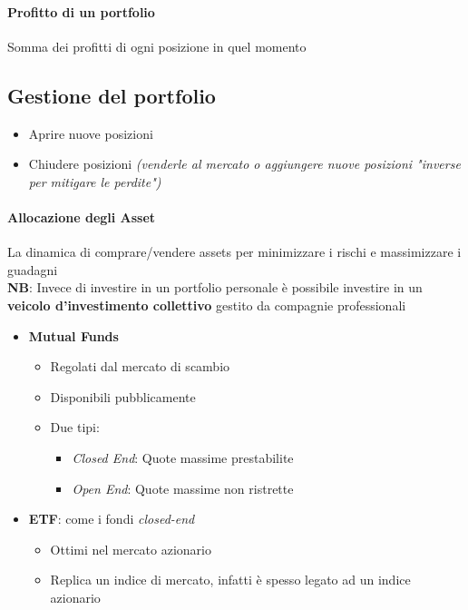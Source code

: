 \documentclass[12pt]{article}
\begin{document}
\paragraph{Profitto di un portfolio} Somma dei profitti di ogni posizione in quel momento
\subsection{Gestione del portfolio}
\begin{itemize}
    \item Aprire nuove posizioni
    \item Chiudere posizioni \textit{(venderle al mercato o aggiungere nuove posizioni "inverse per mitigare le perdite")}
\end{itemize}
\paragraph{Allocazione degli Asset} La dinamica di comprare/vendere assets per minimizzare i rischi e massimizzare i guadagni\\[12pt]
\textbf{NB}: Invece di investire in un portfolio personale è possibile investire in un \textbf{veicolo d'investimento collettivo} gestito da compagnie professionali
\begin{itemize}
    \item \textbf{Mutual Funds}
          \begin{itemize}
              \item Regolati dal mercato di scambio
              \item Disponibili pubblicamente
              \item Due tipi:
                    \begin{itemize}
                        \item \textit{Closed End}: Quote massime prestabilite
                        \item \textit{Open End}: Quote massime non ristrette
                    \end{itemize}
          \end{itemize}
    \item \textbf{ETF}: come i fondi \textit{closed-end}
          \begin{itemize}
              \item Ottimi nel mercato azionario
              \item Replica un indice di mercato, infatti è spesso legato ad un indice azionario
          \end{itemize}
\end{itemize}
\end{document}
